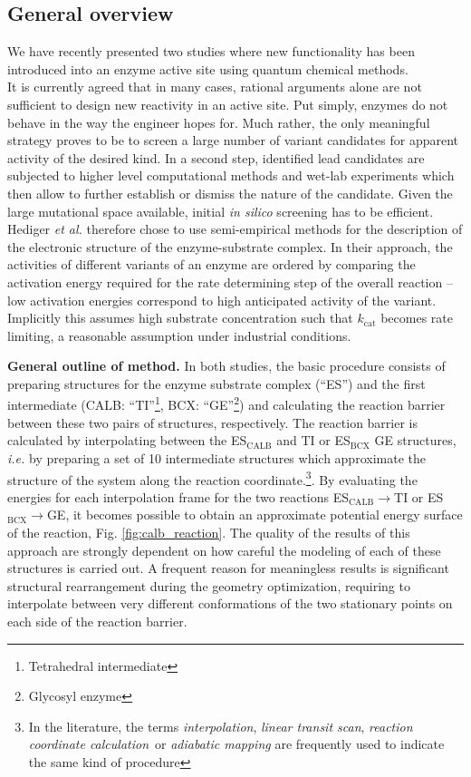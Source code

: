 \subsection{General overview}
We have recently presented two studies where new functionality has been introduced into an enzyme active site using quantum chemical methods\cite{10.1371/journal.pone.0049849,hediger2013silico,hediger2013computational}.\\
It is currently agreed that in many cases, rational arguments alone are not sufficient to design new reactivity in an active site.
Put simply, enzymes do not behave in the way the engineer hopes for.
Much rather, the only meaningful strategy proves to be to screen a large number of variant candidates for apparent activity of the desired kind.
In a second step, identified lead candidates are subjected to higher level computational methods and wet-lab experiments which then allow to further establish or dismiss the nature of the candidate.
Given the large mutational space available, initial \textit{in silico} screening has to be efficient.
Hediger \textit{et al.} therefore chose to use semi-empirical methods for the description of the electronic structure of the enzyme-substrate complex.
In their approach, the activities of different variants of an enzyme are ordered by comparing the activation energy required for the rate determining step of the overall reaction -- low activation energies correspond to high anticipated activity of the variant.
Implicitly this assumes high substrate concentration such that $k_\text{cat}$ becomes rate limiting, a reasonable assumption under industrial conditions.

\textbf{General outline of method.}
In both studies, the basic procedure consists of preparing structures for the enzyme substrate complex (``ES'') and the first intermediate (CALB: ``TI''\footnote{Tetrahedral intermediate}, BCX: ``GE''\footnote{\label{foot:ge}Glycosyl enzyme}) and calculating the reaction barrier between these two pairs of structures, respectively.
The reaction barrier is calculated by interpolating between the ES$_\text{CALB}$ and TI or ES$_\text{BCX}$ GE structures, \textit{i.e.} by preparing a set of 10 intermediate structures which approximate the structure of the system along the reaction coordinate.\footnote{In the literature, the terms \textit{interpolation}, \textit{linear transit scan}, \textit{reaction coordinate calculation} or \textit{adiabatic mapping} are frequently used to indicate the same kind of procedure}.
By evaluating the energies for each interpolation frame for the two reactions ES$_\text{CALB}\rightarrow$TI or ES$_\text{BCX}\rightarrow$GE, it becomes possible to obtain an approximate potential energy surface of the reaction, Fig. \ref{fig:calb_reaction}.
The quality of the results of this approach are strongly dependent on how careful the modeling of each of these structures is carried out.
A frequent reason for meaningless results is significant structural rearrangement during the geometry optimization, requiring to interpolate between very different conformations of the two stationary points on each side of the reaction barrier.

